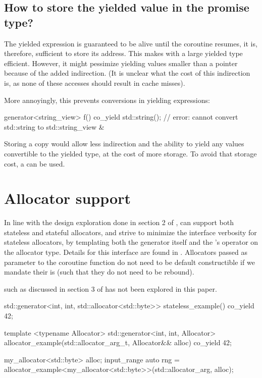 \documentclass{wg21}
\begin{document}
\subsection{How to store the yielded value in the promise type?}

The yielded expression is guaranteed to be alive until the coroutine resumes, it is, therefore, sufficient to store
its address. 
This makes  with a large yielded type efficient.
However, it might pessimize yielding values smaller than a pointer because of the added indirection.
(It is unclear what the cost of this indirection is, as none of these accesses should result in cache misses).

More annoyingly, this prevents conversions in yielding expressions:

\begin{colorblock}
    generator<string_view> f() {
        co_yield std::string(); // error: cannot convert std::string to std::string_view \&
    }
\end{colorblock}

Storing a copy would allow less indirection and the ability to yield any values convertible to the yielded type,
at the cost of more storage.
To avoid that storage cost, a  can be used.


\section{Allocator support}

In line with the design exploration done in section 2 of ,  can support both stateless and stateful allocators, and strive
to minimize the interface verbosity for stateless allocators, by templating both the generator itself and the 's  operator
on the allocator type. Details for this interface are found in .
Allocators passed as parameter to the coroutine function do not need to be default constructible if we mandate their  is 
(such that they do not need to be rebound).

 such as discussed in section 3 of  has not been explored in this paper.

\begin{colorblock}
    std::generator<int, int, std::allocator<std::byte>> stateless_example() {
        co_yield 42;
    }
    
    template <typename Allocator>
    std::generator<int, int, Allocator> 
    allocator_example(std::allocator_arg_t, Allocator&& alloc) {
        co_yield 42;
    }
    
    my_allocator<std::byte> alloc;
    input_range auto rng = allocator_example<my_allocator<std::byte>>(std::allocator_arg, alloc);
    
\end{colorblock}
\end{document}
